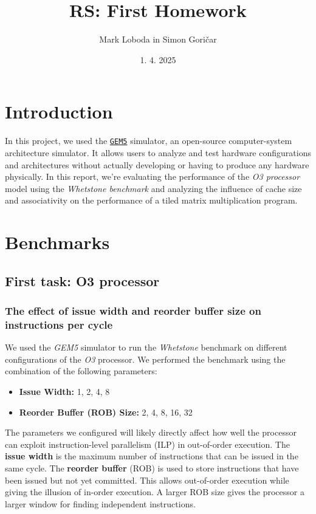 \documentclass[10pt]{article}
\title{RS: First Homework}
\author{
    Mark Loboda in Simon Goričar
}
\date{1. 4. 2025}
\begin{document}
\maketitle


\section{Introduction}
In this project, we used the \href{https://www.gem5.org}{\texttt{GEM5}} simulator, an open-source computer-system architecture simulator. It allows users to analyze and test hardware configurations and architectures without actually developing or having to produce any hardware physically. In this report, we're evaluating the performance of the \textit{O3 processor} model using the \textit{Whetstone benchmark} and analyzing the influence of cache size and associativity on the performance of a tiled matrix multiplication program.


\section{Benchmarks}
\subsection{First task: O3 processor}
\subsubsection{The effect of issue width and reorder buffer size on instructions per cycle}
We used the \textit{GEM5} simulator to run the \textit{Whetstone} benchmark on different configurations of the \textit{O3} processor. We performed the benchmark using the combination of the following parameters:

\begin{itemize}
    \item \textbf{Issue Width:} 1, 2, 4, 8
    \item \textbf{Reorder Buffer (ROB) Size:} 2, 4, 8, 16, 32
\end{itemize}

The parameters we configured will likely directly affect how well the processor can exploit instruction-level parallelism (ILP) in out-of-order execution. The \textbf{issue width} is the maximum number of instructions that can be issued in the same cycle. The \textbf{reorder buffer} (ROB) is used to store instructions that have been issued but not yet committed. This allows out-of-order execution while giving the illusion of in-order execution. A larger ROB size gives the processor a larger window for finding independent instructions.
\end{document}
